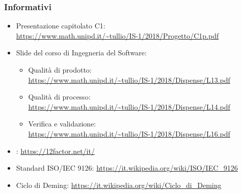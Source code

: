     \subsubsection{Informativi}
    \begin{itemize}
    	\item Presentazione capitolato C1:\\ \url{https://www.math.unipd.it/~tullio/IS-1/2018/Progetto/C1p.pdf}
    	\item Slide del corso di Ingegneria del Software:
    	
    	\begin{itemize}
    		\item Qualità di prodotto:\\ \url{https://www.math.unipd.it/~tullio/IS-1/2018/Dispense/L13.pdf}
    		\item Qualità di processo:\\ \url{https://www.math.unipd.it/~tullio/IS-1/2018/Dispense/L14.pdf}
    		\item Verifica e validazione:\\
    		\url{https://www.math.unipd.it/~tullio/IS-1/2018/Dispense/L16.pdf}
    	\end{itemize}
    	\item {}:
    	\url{https://12factor.net/it/}
    	\item Standard ISO/IEC 9126:
    	\url{https://it.wikipedia.org/wiki/ISO/IEC_9126}
    	\item Ciclo di Deming:
    	\url{https://it.wikipedia.org/wiki/Ciclo_di_Deming}
    \end{itemize}